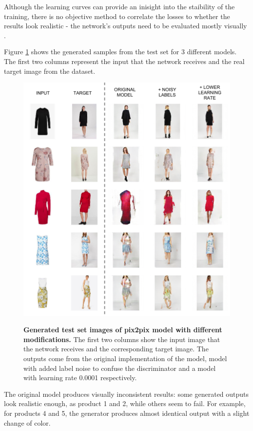 \documentclass[12pt]{report}
\begin{document}
Although the learning curves can provide an inisight into the staibility of the training, there is no objective method to correlate the losses to whether the results look realistic - the network's outputs need to be evaluated mostly visually \cite{preserve_knowledge_how_nodate}. 

Figure \ref{fig:pix2pix_results} shows the generated samples from the test set for 3 different models. The first two columns represent the input that the network receives and the real target image from the dataset. 

\begin{figure}[!h]
\centering
{\includegraphics[width=.8\linewidth]{04_experiments/pix2pix/results}}
\caption{\label{fig:pix2pix_results} \textbf{Generated test set images of pix2pix model with different modifications.} The first two columns show the input image that the network receives and the corresponding target image. The outputs come from the original implementation of the model, model with added label noise to confuse the discriminator and a model with learning rate 0.0001 respectively.}
\end{figure}

The original model produces visually inconsistent results: some generated outputs look realistic enough, as product 1 and 2, while others seem to fail. For example, for products 4 and 5, the generator produces almost identical output with a slight change of color.
\end{document}
